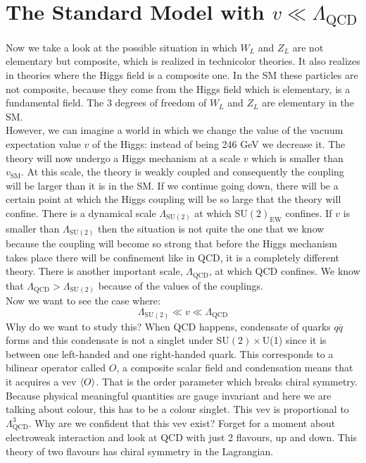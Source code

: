 \documentclass[../main.tex]{subfiles}
\begin{document}
\section{The Standard Model with $v\ll\Lambda_{\text{QCD}}$}
Now we take a look at the possible situation in which $W_L$ and $Z_L$ are not elementary but composite, which is realized in technicolor theories. It also realizes in theories where the Higgs field is a composite one. In the SM these particles are not composite, because they come from the Higgs field which is elementary, is a fundamental field. The 3 degrees of freedom of $W_L$ and $Z_L$ are elementary in the SM.\\
However, we can imagine a world in which we change the value of the vacuum expectation value $v$ of the Higgs: instead of being 246 GeV we decrease it. The theory will now undergo a Higgs mechanism at a scale $v$ which is smaller than $v_{\text{SM}}$. At this scale, the theory is weakly coupled and consequently the coupling will be larger than it is in the SM. If we continue going down, there will be a certain point at which the Higgs coupling will be so large that the theory will confine. There is a dynamical scale $\Lambda_{\text{SU}(2)}$ at which SU$(2)_{\text{EW}}$ confines. If $v$ is smaller than $\Lambda_{\text{SU}(2)}$ then the situation is not quite the one that we know because the coupling will become so strong that before the Higgs mechanism takes place there will be confinement like in QCD, it is a completely different theory. There is another important scale, $\Lambda_{\text{QCD}}$, at which QCD confines. We know that $\Lambda_{\text{QCD}}>\Lambda_{\text{SU}(2)}$ because of the values of the couplings.\\
Now we want to see the case where:
\[
\Lambda_{\text{SU}(2)}\ll v\ll\Lambda_{\text{QCD}}
\]
Why do we want to study this? When QCD happens, condensate of quarks $q\overline{q}$ forms and this condensate is not a singlet under SU$(2)\times$U(1) since it is between one left-handed and one right-handed quark. This corresponds to a bilinear operator called $O$, a composite scalar field and condensation means that it acquires a vev $\Braket{O}$. That is the order parameter which breaks chiral symmetry. Because physical meaningful quantities are gauge invariant and here we are talking about colour, this has to be a colour singlet. This vev is proportional to $\Lambda_{\text{QCD}}^3$. Why are we confident that this vev exist? Forget for a moment about electroweak interaction and look at QCD with just 2 flavours, up and down. This theory of two flavours has chiral symmetry in the Lagrangian.
\end{document}
